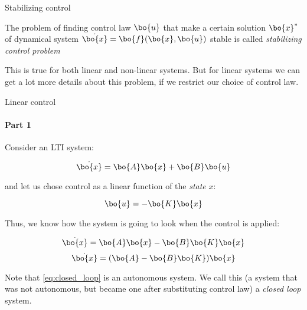 \documentclass{beamer}
\begin{document}
\begin{frame}{Stabilizing control}
\begin{flushleft}

\begin{definition}
The problem of finding control law $\bo{u}$ that make a certain solution $\bo{x}^*$ of dynamical system $\dot{\bo{x}} = \bo{f}(\bo{x}, \bo{u})$ stable is called \emph{stabilizing control problem}
\end{definition}

\bigskip

This is true for both linear and non-linear systems. But for linear systems we can get a lot more details about this problem, if we restrict our choice of control law.



\end{flushleft}
\end{frame}



\begin{frame}{Linear control}
\framesubtitle{Part 1}
\begin{flushleft}

Consider an LTI system:

\begin{equation}
    \dot{\bo{x}} = \bo{A}\bo{x} + \bo{B}\bo{u}
\end{equation}

and let us chose control as a linear function of the \emph{state} $x$:

\begin{equation}
    \bo{u} = -\bo{K}\bo{x}
\end{equation}

Thus, we know how the system is going to look when the control is applied:

\begin{equation}
    \dot{\bo{x}} = \bo{A}\bo{x} - \bo{B}\bo{K}\bo{x}
\end{equation}
\begin{equation}
\label{eq:closed_loop}
    \dot{\bo{x}} = (\bo{A} - \bo{B}\bo{K})\bo{x}
\end{equation}

Note that \eqref{eq:closed_loop} is an autonomous system. We call this (a system that was not autonomous, but became one after substituting control law) a \emph{closed loop} system.

\end{flushleft}
\end{frame}
\end{document}
